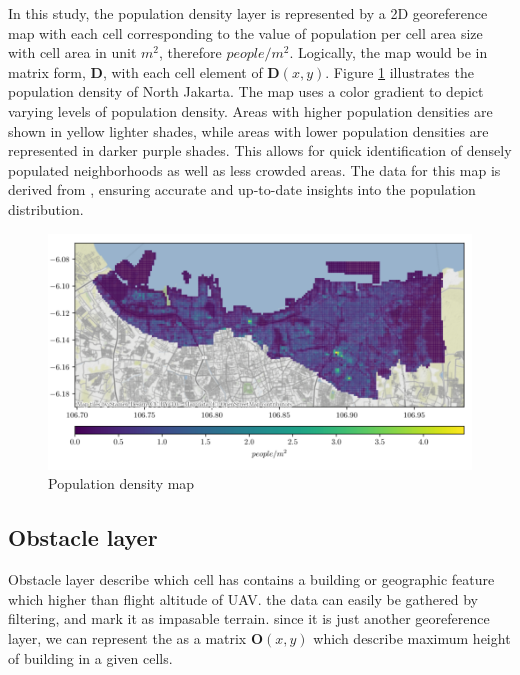 \documentclass[12pt]{report}
\begin{document}
            In this study, the population density layer is represented by a 2D georeference map with each cell
            corresponding to the value of population per cell area size with cell area in unit \(m^2\), therefore
            \(people/m^2\). Logically, the map would be in matrix form, \textbf{D}, with each cell element of
            \(\mathbf{D}(x, y)\). Figure \ref{fig:population} illustrates the population density of North Jakarta. The
            map uses a color gradient to depict varying levels of population density. Areas with higher population
            densities are shown in yellow lighter shades, while areas with lower population densities are represented in
            darker purple shades. This allows for quick identification of densely populated neighborhoods as well as
            less crowded areas. The data for this map is derived from \cite{commission_ghsl_2023}, ensuring accurate and
            up-to-date insights into the population distribution. 
            
            \begin{figure}[H]
                \centering
                \includegraphics[width=\textwidth]{Plot/pop_dense.PNG}
                \caption{Population density map}
                \label{fig:population}
            \end{figure}

        \subsection{Obstacle layer}
            Obstacle layer describe which cell has contains a building or geographic feature which higher than flight
            altitude of UAV. the data can easily be gathered by filtering, and mark it as impasable terrain. since it is
            just another georeference layer, we can represent the as a matrix \(\mathbf{O}(x, y)\) which describe
            maximum height of building in a given cells. 
\end{document}
